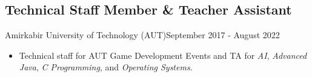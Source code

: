 \subsection{Technical Staff Member \& Teacher Assistant}{Amirkabir University of Technology (AUT)}{September 2017 - August 2022}
\begin{itemize}
    \item Technical staff for AUT Game Development Events and TA for \textit{AI}, \textit{Advanced Java}, \textit{C Programming}, and \textit{Operating Systems}.
\end{itemize}
